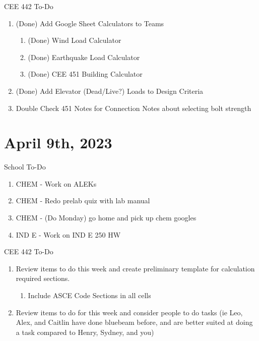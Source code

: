 \documentclass{report} %
\begin{document}
\noindent
CEE 442 To-Do
\begin{enumerate}
    \item (Done) Add Google Sheet Calculators to Teams
    \begin{enumerate}
        \item (Done) Wind Load Calculator
        \item (Done) Earthquake Load Calculator
        \item (Done) CEE 451 Building Calculator
    \end{enumerate}
    \item (Done) Add Elevator (Dead/Live?) Loads to Design Criteria
    \item Double Check 451 Notes for Connection Notes about selecting bolt strength
\end{enumerate}

\section*{April 9th, 2023}
\noindent
School To-Do
\begin{enumerate}
    \item CHEM - Work on ALEKs
    \item CHEM - Redo prelab quiz with lab manual
    \item CHEM - (Do Monday) go home and pick up chem googles
    \item IND E - Work on IND E 250 HW
\end{enumerate}

\noindent
CEE 442 To-Do
\begin{enumerate}
    \item Review items to do this week and create preliminary template for calculation required sections.
    \begin{enumerate}
        \item Include ASCE Code Sections in all cells 
    \end{enumerate}
    \item Review items to do for this week and consider people to do tasks (ie Leo, Alex, and Caitlin have done bluebeam before, and are better suited at doing a task compared to Henry, Sydney, and you)
\end{enumerate}
\end{document}
